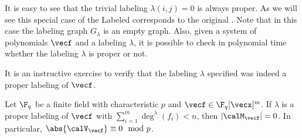 \noindent It is easy to see that the trivial labeling $\lambda(i, j) = 0$ is always proper.
As we will see this special case of the Labeled \CWT\! corresponds to the
original \CWT\!. Note that in this case the
labeling graph $G_{\lambda}$ is an empty graph. Also, given a
system of polynomials $\vecf$ and a labeling $\lambda$, it is possible to
check in polynomial time whether the labeling $\lambda$ is proper or not.

\bigskip
{} It is an instructive exercise to verify that the labeling $\lambda$ specified was indeed a proper labeling of $\vecf$.
\bigskip


\begin{theorem}
  \label{thm:labeledChevalleyWarningTheorem}
    Let $\F_q$ be a finite field with characteristic $p$ and
  $\vecf \in \F_q[\vecx]^m$. If $\lambda$ is a proper labeling of
  $\vecf$ with $\sum_{i = 1}^m \deg^{\lambda}(f_i) < n$, then $|\calM_{\vecf}| = 0$. In particular, $\abs{\calV_{\vecf}} \equiv 0 \mod{p}$.
\end{theorem}
